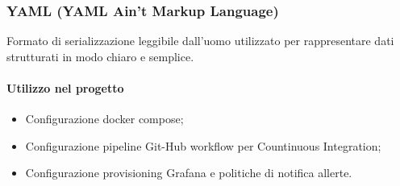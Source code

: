\subsubsection{YAML (YAML Ain't Markup Language)}
Formato di serializzazione leggibile dall'uomo utilizzato per rappresentare dati strutturati in modo chiaro e semplice.

\paragraph{Utilizzo nel progetto}
\begin{itemize}
    \item Configurazione
    docker compose;
    \item Configurazione pipeline Git-Hub workflow per Countinuous Integration;
    \item Configurazione provisioning Grafana e politiche di notifica allerte.
\end{itemize}
